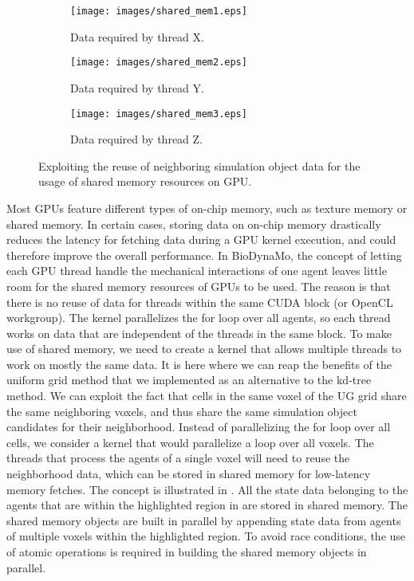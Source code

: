 \documentclass[conference]{IEEEtran}
\begin{document}
\begin{figure}[t]%
    \begin{subfigure}[t]{0.15\textwidth}
    \texttt{[image: images/shared\_mem1.eps]}
    \caption{Data required by thread X.}
    \end{subfigure}
\hfill%
    \begin{subfigure}[t]{0.15\textwidth}
    \texttt{[image: images/shared\_mem2.eps]}
    \caption{Data required by thread Y.}
\end{subfigure}
\hfill%
    \begin{subfigure}[t]{0.15\textwidth}
    \texttt{[image: images/shared\_mem3.eps]}
    \caption{Data required by thread Z.}
\end{subfigure}
    \caption{Exploiting the reuse of neighboring simulation object data for the usage of shared memory resources on GPU.}
    \label{fig:gpu_improvement4}
\end{figure}

\par Most GPUs feature different types of on-chip memory, such as texture memory or shared memory.
In certain cases, storing data on on-chip memory drastically reduces the latency for fetching data during a GPU kernel execution, and could therefore improve the overall performance. 
In BioDynaMo, the concept of letting each GPU thread handle the mechanical interactions of one agent leaves little room for the shared memory resources of GPUs to be used.
The reason is that there is no reuse of data for threads within the same CUDA block (or OpenCL workgroup).
The kernel parallelizes the for loop over all agents, so each thread works on data that are independent of the threads in the same block.
To make use of shared memory, we need to create a kernel that allows multiple threads to work on mostly the same data.
It is here where we can reap the benefits of the uniform grid method that we implemented as an alternative to the kd-tree method.
We can exploit the fact that cells in the same voxel of the UG grid share the same neighboring voxels, and thus share the same simulation object candidates for their neighborhood.
Instead of parallelizing the for loop over all cells, we consider a kernel that would parallelize a loop over all voxels.
The threads that process the agents of a single voxel will need to reuse the neighborhood data, which can be stored in shared memory for low-latency memory fetches.
The concept is illustrated in .
All the state data belonging to the agents that are within the highlighted region in  are stored in shared memory.
The shared memory objects are built in parallel by appending state data from agents of multiple voxels within the highlighted region.
To avoid race conditions, the use of atomic operations is required in building the shared memory objects in parallel.
\end{document}
